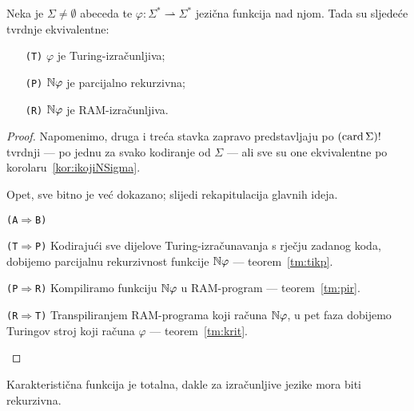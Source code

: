 \begin{teorem}
Neka je $\Sigma\ne\emptyset$ abeceda te $\varphi:\Sigma^*\rightharpoonup\Sigma^*$ jezična funkcija nad njom. Tada su sljedeće tvrdnje ekvivalentne:
\begin{itemize}
    \item[\texttt{\textup{(T)}}] $\varphi$ je Turing-izračunljiva;
    \item[\texttt{\textup{(P)}}] ${\mathbb N}\varphi$ je parcijalno rekurzivna;
    \item[\texttt{\textup{(R)}}] ${\mathbb N}\varphi$ je RAM-izračunljiva.
\end{itemize}
\end{teorem}
\begin{proof}
Napomenimo, druga i treća stavka zapravo predstavljaju po $(\operatorname{card}\Sigma)!$ tvrdnji --- po jednu za svako kodiranje od $\Sigma$ --- ali sve su one ekvivalentne po korolaru~\ref{kor:ikojiNSigma}.

Opet, sve bitno je već dokazano; slijedi rekapitulacija glavnih ideja.
\begin{labeling}{\texttt{(A$\Rightarrow$B)}}
\item[\texttt{(T$\Rightarrow$P)}] Kodirajući sve dijelove Turing-izračunavanja s rječju zadanog koda, dobijemo parcijalnu rekurzivnost funkcije ${\mathbb N}\varphi$ --- teorem~\ref{tm:tikp}.
\item[\texttt{(P$\Rightarrow$R)}] Kompiliramo funkciju ${\mathbb N}\varphi$ u RAM-program --- teorem~\ref{tm:pir}.
\item[\texttt{(R$\Rightarrow$T)}] Transpiliranjem RAM-programa koji računa ${\mathbb N}\varphi$, u pet faza dobijemo Turingov stroj koji računa $\varphi$ --- teorem~\ref{tm:krit}.\qedhere
\end{labeling}
\end{proof}

\noindent Karakteristična funkcija je totalna, dakle za izračunljive jezike mora biti rekurzivna.

